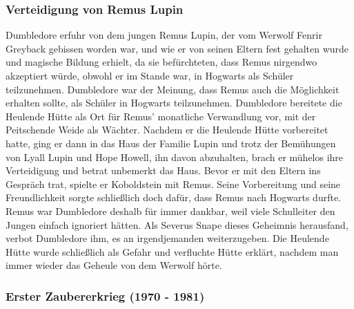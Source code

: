 \documentclass[a4paper, 10pt]{article}
\begin{document}
\subsubsection*{Verteidigung von Remus Lupin}
Dumbledore erfuhr von dem jungen Remus Lupin, der vom Werwolf Fenrir Greyback gebissen worden war, und wie er von seinen Eltern fest gehalten wurde und magische Bildung erhielt, da sie befürchteten, dass Remus nirgendwo akzeptiert würde, obwohl er im Stande war, in Hogwarts als Schüler teilzunehmen. Dumbledore war der Meinung, dass Remus auch die Möglichkeit erhalten sollte, als Schüler in Hogwarts teilzunehmen. Dumbledore bereitete die Heulende Hütte als Ort für Remus' monatliche Verwandlung vor, mit der Peitschende Weide als Wächter. Nachdem er die Heulende Hütte vorbereitet hatte, ging er dann in das Haus der Familie Lupin und trotz der Bemühungen von Lyall Lupin und Hope Howell, ihn davon abzuhalten, brach er mühelos ihre Verteidigung und betrat unbemerkt das Haus. Bevor er mit den Eltern ins Gespräch trat, spielte er Koboldstein mit Remus. Seine Vorbereitung und seine Freundlichkeit sorgte schließlich doch dafür, dass Remus nach Hogwarts durfte. Remus war Dumbledore deshalb für immer dankbar, weil viele Schulleiter den Jungen einfach ignoriert hätten. Als Severus Snape dieses Geheimnis herausfand, verbot Dumbledore ihm, es an irgendjemanden weiterzugeben. Die Heulende Hütte wurde schließlich als Gefahr und verfluchte Hütte erklärt, nachdem man immer wieder das Geheule von dem Werwolf hörte.

\subsubsection*{\large Erster Zaubererkrieg (1970 - 1981)}
\end{document}
